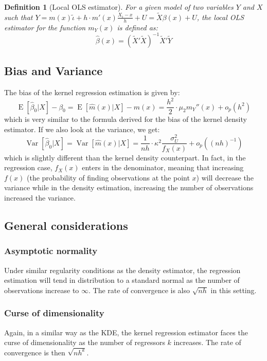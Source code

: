 \documentclass[12pt]{report}
\newtheorem{definition}{Definition}[chapter]
\newcommand{\E}[1]{\operatorname{E}\left[#1\right]}
\newcommand{\V}[1]{\operatorname{Var}\left[#1\right]}
\begin{document}
\begin{definition}[Local OLS estimator]
For a given model of two variables $Y$ and $X$ such that $Y = m(x)\tilde\iota + h\cdot m'(x)\frac{X_i - x}{h} + U = \tilde X\beta (x) + U $, the local OLS estimator for the function $m_Y(x)$ is defined as:
$$\hat\beta(x) = (\tilde X'\tilde X)^{-1}\tilde X'\tilde Y $$
\end{definition}

\subsection{Bias and Variance}

The bias of the kernel regression estimation is given by: $$\E{\hat \beta_0\vert X} - \beta_0 = \E{\hat m(x)\vert X} - m(x) = \frac{h^2}{2} \cdot \mu_2 m_Y''(x) + o_p(h^2) $$ which is very similar to the formula derived for the bias of the kernel density estimator. If we also look at the variance, we get: $$\V{\hat \beta_0\vert X} = \V{\hat m(x)\vert X} = \frac{1}{nh}\cdot\kappa^2\frac{\sigma_U^2}{f_X(x)} + o_p((nh)^{-1}) $$ which is slightly different than the kernel density counterpart. In fact, in the regression case, $f_X(x)$ enters in the denominator, meaning that increasing $f(x)$ (the probability of finding observations at the point $x$) will decrease the variance while in the density estimation, increasing the number of observations increased the variance.

\subsection{General considerations}

\subsubsection{Asymptotic normality}

Under similar regularity conditions as the density estimator, the regression estimation will tend in distribution to a standard normal as the number of observations increase to $\infty$. The rate of convergence is also $\sqrt{nh}$ in this setting.

\subsubsection{Curse of dimensionality}

Again, in a similar way as the KDE, the kernel regression estimator faces the curse of dimensionality as the number of regressors $k$ increases. The rate of convergence is then $\sqrt{nh^k}$.
\end{document}
